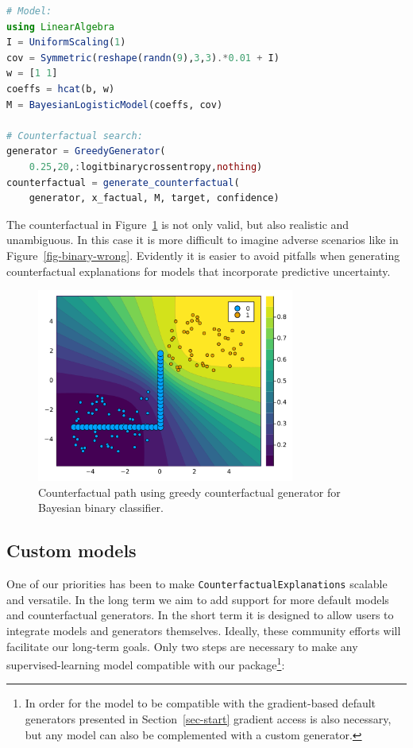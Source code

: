 \documentclass{juliacon}
\begin{document}
\begin{lstlisting}[language = Julia]
# Model:
using LinearAlgebra
I = UniformScaling(1)
cov = Symmetric(reshape(randn(9),3,3).*0.01 + I) 
w = [1 1]
coeffs = hcat(b, w)
M = BayesianLogisticModel(coeffs, cov)

# Counterfactual search:
generator = GreedyGenerator(
    0.25,20,:logitbinarycrossentropy,nothing)
counterfactual = generate_counterfactual(
    generator, x_factual, M, target, confidence)
\end{lstlisting}

The counterfactual in Figure~\ref{fig-binary-laplace} is not only valid,
but also realistic and unambiguous. In this case it is more difficult to
imagine adverse scenarios like in Figure~\ref{fig-binary-wrong}.
Evidently it is easier to avoid pitfalls when generating counterfactual
explanations for models that incorporate predictive uncertainty.

\begin{figure}

{\centering \includegraphics[width=3.33333in,height=2.5in]{www/ce_binary_laplace.png}

}

\caption{\label{fig-binary-laplace}Counterfactual path using greedy
counterfactual generator for Bayesian binary classifier.}

\end{figure}

\hypertarget{sec-custom}{%
\subsection{Custom models}\label{sec-custom}}

One of our priorities has been to make
\texttt{CounterfactualExplanations} scalable and versatile. In the long
term we aim to add support for more default models and counterfactual
generators. In the short term it is designed to allow users to integrate
models and generators themselves. Ideally, these community efforts will
facilitate our long-term goals. Only two steps are necessary to make any
supervised-learning model compatible with our package\footnote{In order
  for the model to be compatible with the gradient-based default
  generators presented in Section~\ref{sec-start} gradient access is
  also necessary, but any model can also be complemented with a custom
  generator.}:
\end{document}
